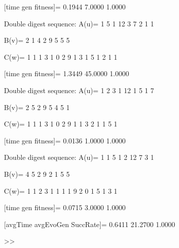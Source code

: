 [time gen fitness]=
    0.1944    7.0000    1.0000

Double digest sequence:
A(u)=
     1     5     1    12     3     7     2     1     1

B(v)=
     2     1     4     2     9     5     5     5

C(w)=
     1     1     1     3     1     0     2     9     1     3     1     5     1     2     1     1

[time gen fitness]=
    1.3449   45.0000    1.0000

Double digest sequence:
A(u)=
     1     2     3     1    12     1     5     1     7

B(v)=
     2     5     2     9     5     4     5     1

C(w)=
     1     1     1     3     1     0     2     9     1     1     3     2     1     1     5     1

[time gen fitness]=
    0.0136    1.0000    1.0000

Double digest sequence:
A(u)=
     1     1     5     1     2    12     7     3     1

B(v)=
     4     5     2     9     2     1     5     5

C(w)=
     1     1     2     3     1     1     1     1     9     2     0     1     5     1     3     1

[time gen fitness]=
    0.0715    3.0000    1.0000

[avgTime  avgEvoGen  SuccRate]=
    0.6411   21.2700    1.0000

>> 
